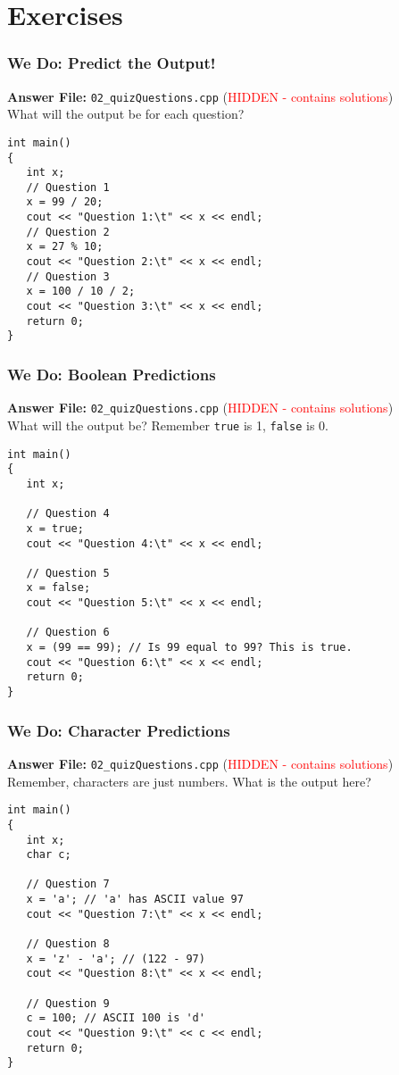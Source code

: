 \documentclass{beamer}
\begin{document}
\section{Exercises}

\begin{frame}[fragile]
\frametitle{We Do: Predict the Output!}
\textbf{Answer File:} \texttt{02\_quizQuestions.cpp} (\textcolor{red}{HIDDEN - contains solutions})
\\What will the output be for each question?\pause
\begin{verbatim}
int main()
{
   int x;
   // Question 1
   x = 99 / 20;
   cout << "Question 1:\t" << x << endl;
   // Question 2
   x = 27 % 10;
   cout << "Question 2:\t" << x << endl;
   // Question 3
   x = 100 / 10 / 2;
   cout << "Question 3:\t" << x << endl;
   return 0;
}
\end{verbatim}
\end{frame}

\begin{frame}[fragile]
\frametitle{We Do: Boolean Predictions}
\textbf{Answer File:} \texttt{02\_quizQuestions.cpp} (\textcolor{red}{HIDDEN - contains solutions})
\\What will the output be? Remember \texttt{true} is 1, \texttt{false} is 0.\pause
\begin{verbatim}
int main()
{
   int x;

   // Question 4
   x = true;
   cout << "Question 4:\t" << x << endl;
   
   // Question 5
   x = false;
   cout << "Question 5:\t" << x << endl;
   
   // Question 6
   x = (99 == 99); // Is 99 equal to 99? This is true.
   cout << "Question 6:\t" << x << endl;
   return 0;
}
\end{verbatim}
\end{frame}

\begin{frame}[fragile]
\frametitle{We Do: Character Predictions}
\textbf{Answer File:} \texttt{02\_quizQuestions.cpp} (\textcolor{red}{HIDDEN - contains solutions})
\\Remember, characters are just numbers. What is the output here?\pause
\begin{verbatim}
int main()
{
   int x;
   char c;

   // Question 7
   x = 'a'; // 'a' has ASCII value 97
   cout << "Question 7:\t" << x << endl;
   
   // Question 8
   x = 'z' - 'a'; // (122 - 97)
   cout << "Question 8:\t" << x << endl;

   // Question 9
   c = 100; // ASCII 100 is 'd'
   cout << "Question 9:\t" << c << endl;
   return 0;
}
\end{verbatim}
\end{frame}
\end{document}
